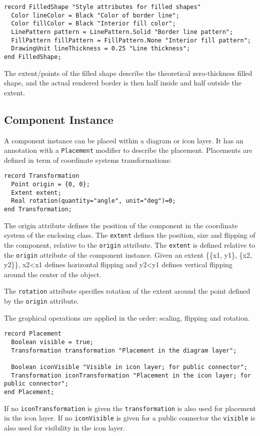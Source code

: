 \begin{lstlisting}[language=modelica]
record FilledShape "Style attributes for filled shapes"
  Color lineColor = Black "Color of border line";
  Color fillColor = Black "Interior fill color";
  LinePattern pattern = LinePattern.Solid "Border line pattern";
  FillPattern fillPattern = FillPattern.None "Interior fill pattern";
  DrawingUnit lineThickness = 0.25 "Line thickness";
end FilledShape;
\end{lstlisting}
The extent/points of the filled shape describe the theoretical
zero-thickness filled shape, and the actual rendered border is then half
inside and half outside the extent.

\subsection{Component Instance}

A component instance can be placed within a diagram or icon layer. It
has an annotation with a \lstinline!Placement! modifier to describe the placement.
Placements are defined in term of coordinate systems transformations:

\begin{lstlisting}[language=modelica]
record Transformation
  Point origin = {0, 0};
  Extent extent;
  Real rotation(quantity="angle", unit="deg")=0;
end Transformation;
\end{lstlisting}
The origin attribute defines the position of the component in the
coordinate system of the enclosing class. The \lstinline!extent! defines the
position, size and flipping of the component, relative to the \lstinline!origin!
attribute. The \lstinline!extent! is defined relative to the \lstinline!origin! attribute of the
component instance. Given an extent \{\{x1, y1\}, \{x2, y2\}\},
x2\textless{}x1 defines horizontal flipping and y2\textless{}y1 defines
vertical flipping around the center of the object.

The \lstinline!rotation! attribute specifies rotation of the extent around the point
defined by the \lstinline!origin! attribute.

The graphical operations are applied in the order: scaling, flipping and
rotation.

\begin{lstlisting}[language=modelica]
record Placement
  Boolean visible = true;
  Transformation transformation "Placement in the diagram layer";

  Boolean iconVisible "Visible in icon layer; for public connector";
  Transformation iconTransformation "Placement in the icon layer; for public connector";
end Placement;
\end{lstlisting}
If no \lstinline!iconTransformation! is given the \lstinline!transformation! is also used for
placement in the icon layer. If no \lstinline!iconVisible! is given for a public connector the
\lstinline!visible! is also used for visibility in the icon layer.

